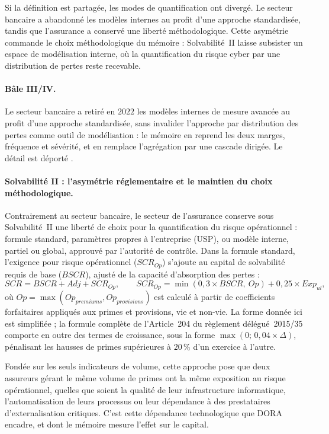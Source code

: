 Si la définition est partagée, les modes de quantification ont divergé. Le secteur bancaire a
abandonné les modèles internes au profit d'une approche standardisée, tandis que l'assurance a
conservé une liberté méthodologique. Cette asymétrie commande le choix méthodologique du
mémoire : Solvabilité~II laisse subsister un espace de modélisation interne, où la
quantification du risque cyber par une distribution de pertes reste recevable.

\paragraph{Bâle III/IV.} Le secteur bancaire a retiré en $2022$ les modèles internes de mesure
avancée au profit d'une approche standardisée, sans invalider l'approche par distribution des
pertes comme outil de modélisation : le mémoire en reprend les deux marges, fréquence et
sévérité, et en remplace l'agrégation par une cascade dirigée. Le détail est déporté
\matcomp.

\paragraph{Solvabilité II : l'asymétrie réglementaire et le maintien du choix méthodologique.}
Contrairement au secteur bancaire, le secteur de l'assurance conserve sous Solvabilité~II
une liberté de choix pour la quantification du risque opérationnel : formule standard,
paramètres propres à l'entreprise (USP), ou modèle interne, partiel ou global, approuvé
par l'autorité de contrôle. Dans la formule standard, l'exigence pour risque opérationnel
($SCR_{Op}$) s'ajoute au capital de solvabilité requis de base
($BSCR$), ajusté de la capacité d'absorption des pertes :
\begin{equation}
SCR = BSCR + Adj + SCR_{Op},
\qquad
SCR_{Op} = \min(0{,}3 \times BSCR,\ Op) + 0{,}25 \times Exp_{ul},
\label{reg:eq:scrop}
\end{equation}
où $Op = \max(Op_{premiums}, Op_{provisions})$ est calculé à partir de coefficients
forfaitaires appliqués aux primes et provisions, vie et non-vie. La forme donnée ici est
simplifiée ; la formule complète de l'Article~204 du règlement délégué~2015/35
comporte en outre des termes de croissance, sous la forme
$\max\!\left(0;\, 0{,}04 \times \Delta\!\right)$, pénalisant les hausses de primes
supérieures à $20\,\%$ d'un exercice à l'autre.

Fondée sur les seuls indicateurs de volume, cette approche pose que deux assureurs gérant le
même volume de primes ont la même exposition au risque opérationnel, quelles que soient la
qualité de leur infrastructure informatique, l'automatisation de leurs processus ou leur
dépendance à des prestataires d'externalisation critiques. C'est cette dépendance
technologique que DORA encadre, et dont le mémoire mesure l'effet sur le capital.

